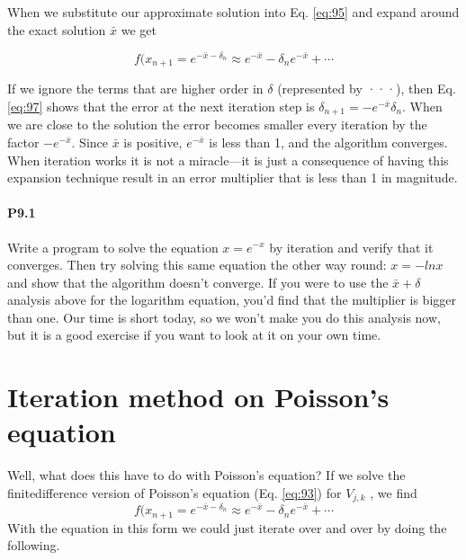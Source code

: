 When we substitute our approximate solution into 
Eq. \eqref{eq:95} and 
expand around the exact solution $ \bar{x} $ we get

\begin{equation}\label{eq:97}
f(x_{n+1}=e^{-\bar{x}-\delta_{n}} \approx e^{-\bar{x}}-\delta_{n} e^{-\bar{x}}+\cdots
\end{equation}

If we ignore the terms that are higher order in $\delta$ (represented by ···), then Eq. \eqref{eq:97}
shows that the error at the next iteration step is $\delta_{n+1} = −e^{−\bar{x}}\delta_n$. When we are close
to the solution the error becomes smaller every iteration by the factor $−e^{-\bar{x}}$. Since $\bar{x}$ is positive, $e^{-\bar{x}}$ is less than 1, and the algorithm converges. When iteration works
it is not a miracle—it is just a consequence of having this expansion technique
result in an error multiplier that is less than 1 in magnitude.

\paragraph*{P9.1}
Write a program to solve the equation $x = e^{−x}$ by iteration and verify that
it converges. Then try solving this same equation the other way round:
$x = −ln x$ and show that the algorithm doesn\rq t converge. If you were to
use the $\bar{x} +\delta$ analysis above for the logarithm equation, you\rq d find that the
multiplier is bigger than one. Our time is short today, so we won\rq t make you
do this analysis now, but it is a good exercise if you want to look at it on
your own time.


\section*{Iteration method on Poisson\rq s equation}
Well, what does this have to do with Poisson\rq s equation? If we solve the finitedifference version of Poisson\rq s equation (Eq. \eqref{eq:93}) for $V_{j,k}$ , we find
\begin{equation}\label{eq:98}
f(x_{n+1}=e^{-\bar{x}-\delta_{n}} \approx e^{-\bar{x}}-\delta_{n} e^{-\bar{x}}+\cdots
\end{equation}
With the equation in this form we could just iterate over and over by doing the
following.

